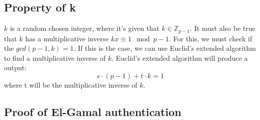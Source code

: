 \subsection{Property of k}
$k$ is a random chosen integer, where it's given that $k \in
\mathbb{Z}_{p-1}$. It must also be true that $k$ has a multiplicative
inverse $kx \equiv 1 \mod p - 1$. For this, we must check if the
$gcd(p-1,k) = 1$. If this is the case, we can use Euclid's extended
algorithm to find a multiplicative inverse of $k$. Euclid's extended 
algorithm will produce a output:
\[s \cdot (p-1) + t \cdot k = 1\]
where t will be the multiplicative inverse of $k$.
\subsection{Proof of El-Gamal authentication}

